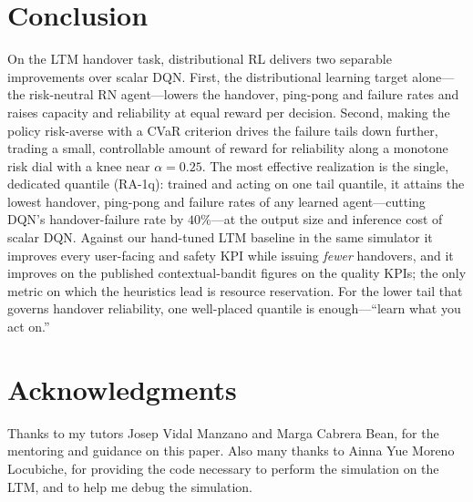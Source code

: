 \documentclass[conference]{IEEEtran}
\begin{document}
\section{Conclusion}
\label{sec:conclusion}
On the LTM handover task, distributional RL delivers two separable improvements
over scalar DQN. First, the distributional learning target alone---the
risk-neutral RN agent---lowers the handover, ping-pong and failure rates and
raises capacity and reliability at equal reward per decision. Second, making the
policy risk-averse with a CVaR criterion drives the failure tails down further,
trading a small, controllable amount of reward for reliability along a monotone
risk dial with a knee near $\alpha=0.25$. The most effective realization is the
single, dedicated quantile (RA-1q): trained and acting on one tail quantile, it
attains the lowest handover, ping-pong and failure rates of any learned
agent---cutting DQN's handover-failure rate by $40\%$---at the output size and
inference cost of scalar DQN. Against our hand-tuned LTM baseline in the same
simulator it improves every user-facing and safety KPI while issuing \emph{fewer}
handovers, and it improves on the published contextual-bandit figures on the
quality KPIs; the only metric on which the heuristics lead is resource
reservation. For the lower tail that governs handover reliability, one well-placed
quantile is enough---``learn what you act on.''

\section*{Acknowledgments}
Thanks to my tutors Josep Vidal Manzano and Marga Cabrera Bean, for the mentoring and guidance on this paper.
Also many thanks to Ainna Yue Moreno Locubiche, for providing the code necessary to perform the simulation on the LTM, and to help me debug the simulation.
\end{document}
